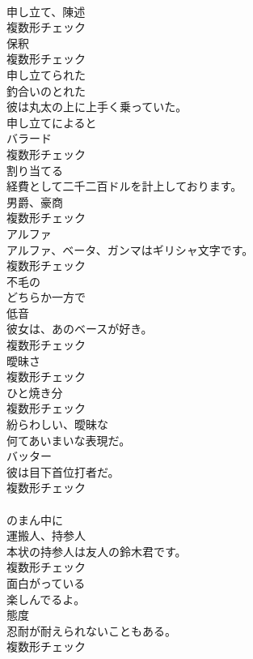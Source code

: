 \documentclass[8pt]{extreport}
\begin{document}
\begin{CJK}{UTF8}{min}
\\	[名詞]	申し立て、陳述	
\\	複数形チェック
\\	[名詞]	保釈	
\\	複数形チェック
\\	[形容詞]	申し立てられた	
\\	[形容詞]	釣合いのとれた	
\\	彼は丸太の上に上手く乗っていた。	
\\	[副詞]	申し立てによると	
\\	[名詞]	バラード	
\\	複数形チェック
\\	[動詞]	割り当てる	
\\	経費として二千二百ドルを計上しております。	
\\	[名詞]	男爵、豪商	
\\	複数形チェック
\\	[名詞]	アルファ	
\\	アルファ、ベータ、ガンマはギリシャ文字です。	
\\	複数形チェック
\\	[形容詞]	不毛の	
\\	[副詞]	どちらか一方で	
\\	[名詞]	低音	
\\	彼女は、あのベースが好き。	
\\	複数形チェック
\\	[名詞]	曖昧さ	
\\	複数形チェック
\\	[名詞]	ひと焼き分	
\\	複数形チェック
\\	[形容詞]	紛らわしい、曖昧な	
\\	何てあいまいな表現だ。	
\\	[名詞]	バッター	
\\	彼は目下首位打者だ。	
\\	複数形チェック
\\	[前置詞]	
\\	のまん中に	
\\	[名詞]	運搬人、持参人	
\\	本状の持参人は友人の鈴木君です。	
\\	複数形チェック
\\	[形容詞]	面白がっている	
\\	楽しんでるよ。	
\\	[名詞]	態度	
\\	忍耐が耐えられないこともある。	
\\	複数形チェック

\end{CJK}
\end{document}
